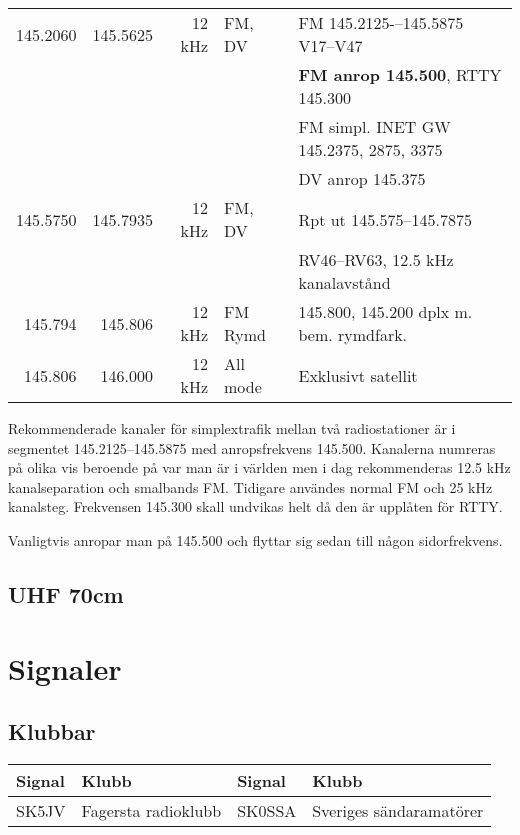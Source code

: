 \documentclass[10pt,swedish,a4paper]{article}
\begin{document}
\begin{landscape}
\begin{tabular}{rrrll}
	145.2060 &  145.5625 &  12 kHz & FM, DV       & FM 145.2125-–145.5875  V17–V47          \\
	         &           &         &              & \textbf{FM anrop 145.500}, RTTY 145.300 \\
	         &           &         &              & FM simpl. INET GW 145.2375, 2875, 3375  \\
	         &           &         &              & DV anrop 145.375                        \\ \hline
	145.5750 &  145.7935 &  12 kHz & FM, DV       & Rpt ut 145.575--145.7875                \\
	         &           &         &              & RV46–RV63, 12.5 kHz kanalavstånd        \\ \hline
	 145.794 &   145.806 &  12 kHz & FM Rymd      & 145.800, 145.200 dplx m. bem. rymdfark. \\ \hline
	 145.806 &   146.000 &  12 kHz & All mode     & Exklusivt satellit                      \\ \hline
\end{tabular}

\end{landscape}

Rekommenderade kanaler för simplextrafik mellan två radiostationer är i segmentet 145.2125--145.5875 med anropsfrekvens 145.500. Kanalerna numreras på olika vis beroende på var man är i världen men i dag rekommenderas 12.5 kHz kanalseparation och smalbands FM. Tidigare användes normal FM och 25 kHz kanalsteg. Frekvensen 145.300 skall undvikas helt då den är upplåten för RTTY.

Vanligtvis anropar man på 145.500 och flyttar sig sedan till någon sidorfrekvens. 




\subsection{UHF 70cm}

\section{Signaler}

\subsection{Klubbar}

\small
\begin{tabular}{ll|ll}
	Signal & Klubb               & Signal & Klubb                   \\ \hline
	SK5JV  & Fagersta radioklubb & SK0SSA & Sveriges sändaramatörer
\end{tabular}
\normalsize
\end{document}

